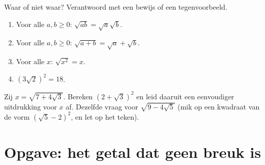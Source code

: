 \begin{exercise}[$\star\star$]\label{exo:g9:sqrt:9}
Waar of niet waar? Verantwoord met een bewijs of een tegenvoorbeeld.
\begin{enumerate}
  \item Voor alle $a, b \geq 0$: $\sqrt{ab} = \sqrt a \sqrt b$.
  \item Voor alle $a, b \geq 0$: $\sqrt{a+b} = \sqrt a + \sqrt b$.
  \item Voor alle $x$: $\sqrt{x^2} = x$.
  \item $\left(3\sqrt2\right)^2 = 18$.
\end{enumerate}
\end{exercise}

\begin{exercise}[$\star\star\star$]\label{exo:g9:sqrt:10}
Zij $x = \sqrt{7 + 4\sqrt3}$. Bereken $\left(2 + \sqrt3\right)^2$ en leid daaruit
een eenvoudiger uitdrukking voor $x$ af. Dezelfde vraag voor
$\sqrt{9 - 4\sqrt5}$ (mik op een kwadraat van de vorm
$\left(\sqrt5 - 2\right)^2$, en let op het teken).
\end{exercise}

\section{Opgave: het getal dat geen breuk is}

